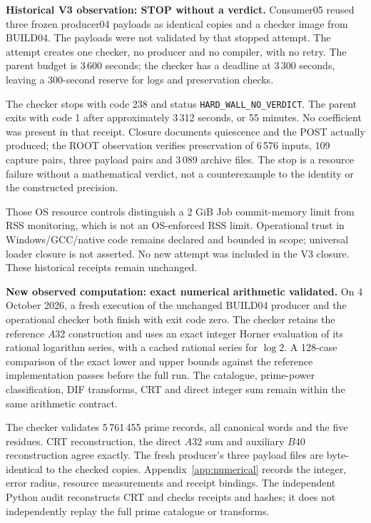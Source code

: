\documentclass[11pt,a4paper]{article}
\theoremstyle{remark}
\begin{document}
\textbf{Historical V3 observation: STOP without a verdict.} Consumer05 reused
three frozen producer04 payloads as identical copies and a checker image
from BUILD04. The payloads were not validated by that stopped attempt.
The attempt creates one checker, no producer and no compiler,
with no retry. The parent budget is 3\,600 seconds; the checker has a deadline
at 3\,300 seconds, leaving a 300-second reserve for logs and preservation checks.

The checker stops with code 238 and status \texttt{HARD\_WALL\_NO\_VERDICT}.
The parent exits with code 1 after approximately 3\,312 seconds, or 55 minutes.
No coefficient was present in that receipt. Closure documents quiescence and the POST actually
produced; the ROOT observation verifies preservation of 6\,576 inputs,
109 capture pairs, three payload pairs and 3\,089 archive files.
The stop is a resource failure without a mathematical verdict, not a
counterexample to the identity or the constructed precision.

Those OS resource controls distinguish a 2 GiB Job commit-memory limit from
RSS monitoring, which is not an OS-enforced RSS limit. Operational trust
in Windows/GCC/native code remains declared and bounded in scope; universal
loader closure is not asserted. No new attempt was included in the V3
closure. These historical receipts remain unchanged.

\textbf{New observed computation: exact numerical arithmetic validated.}
On 4 October 2026, a fresh execution of the unchanged BUILD04 producer and
the operational checker both finish with exit code zero. The checker retains
the reference $A32$ construction and uses an exact integer Horner evaluation
of its rational logarithm series, with a cached rational series for $\log 2$.
A 128-case comparison of the exact lower and upper bounds against the
reference implementation passes before the full run. The catalogue,
prime-power classification, DIF transforms, CRT and direct integer sum
remain within the same arithmetic contract.

The checker validates 5\,761\,455 prime records, all canonical words and the
five residues. CRT reconstruction, the direct $A32$ sum and auxiliary $B40$
reconstruction agree exactly. The fresh producer's three payload files are
byte-identical to the checked copies. Appendix~\ref{app:numerical} records
the integer, error radius, resource measurements and receipt bindings.
The independent Python audit reconstructs CRT and checks receipts and hashes;
it does not independently replay the full prime catalogue or transforms.
\end{document}
